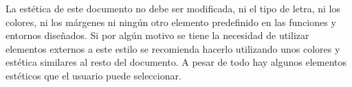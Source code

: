
La estética de este documento no debe ser modificada, ni el tipo de letra, ni los colores, ni los márgenes ni ningún otro elemento predefinido en las funciones y entornos diseñados. Si por algún motivo se tiene la necesidad de utilizar elementos externos a este estilo se recomienda hacerlo utilizando unos colores y estética similares al resto del documento. A pesar de todo hay algunos elementos estéticos que el usuario puede seleccionar.
